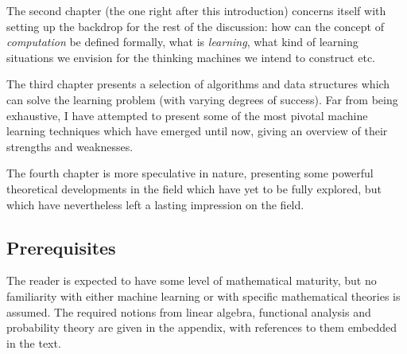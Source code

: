 The second chapter (the one right after this introduction) concerns itself with setting up the backdrop for the rest of the discussion: how can the concept of \emph{computation} be defined formally, what is \emph{learning}, what kind of learning situations we envision for the thinking machines we intend to construct etc.

The third chapter presents a selection of algorithms and data structures which can solve the learning problem (with varying degrees of success). Far from being exhaustive, I have attempted to present some of the most pivotal machine learning techniques which have emerged until now, giving an overview of their strengths and weaknesses.

The fourth chapter is more speculative in nature, presenting some powerful theoretical developments in the field which have yet to be fully explored, but which have nevertheless left a lasting impression on the field.

\subsection{Prerequisites}

The reader is expected to have some level of mathematical maturity, but no familiarity with either machine learning or with specific mathematical theories is assumed. The required notions from linear algebra, functional analysis and probability theory are given in the appendix, with references to them embedded in the text.
